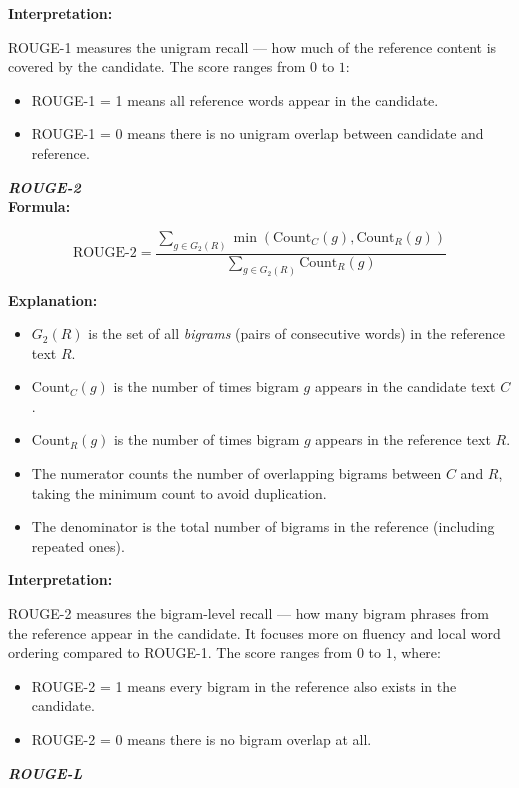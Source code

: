 \documentclass[conference]{IEEEtran}
\begin{document}
\textbf{Interpretation:}

ROUGE-1 measures the unigram recall — how much of the reference content is covered by the candidate. The score ranges from $0$ to $1$:
\begin{itemize}
  \item ROUGE-1 = 1 means all reference words appear in the candidate.
  \item ROUGE-1 = 0 means there is no unigram overlap between candidate and reference.
\end{itemize}

\vspace{1em}
\noindent \textbf{\textit{ROUGE-2}}\\

\textbf{Formula:}

\begin{equation}
\text{ROUGE-2} = \frac{\sum_{g \in G_2(R)} \min \left( \text{Count}_C(g), \text{Count}_R(g) \right)}{\sum_{g \in G_2(R)} \text{Count}_R(g)}
\end{equation}

\textbf{Explanation:}
\begin{itemize}
  \item $G_2(R)$ is the set of all \textit{bigrams} (pairs of consecutive words) in the reference text $R$.
  \item $\text{Count}_C(g)$ is the number of times bigram $g$ appears in the candidate text $C$.
  \item $\text{Count}_R(g)$ is the number of times bigram $g$ appears in the reference text $R$.
  \item The numerator counts the number of overlapping bigrams between $C$ and $R$, taking the minimum count to avoid duplication.
  \item The denominator is the total number of bigrams in the reference (including repeated ones).
\end{itemize}

\textbf{Interpretation:}

ROUGE-2 measures the bigram-level recall — how many bigram phrases from the reference appear in the candidate. It focuses more on fluency and local word ordering compared to ROUGE-1. The score ranges from $0$ to $1$, where:
\begin{itemize}
  \item ROUGE-2 = 1 means every bigram in the reference also exists in the candidate.
  \item ROUGE-2 = 0 means there is no bigram overlap at all.
\end{itemize}
\vspace{1em}
\noindent \textbf{\textit{ROUGE-L}}\\
\end{document}
